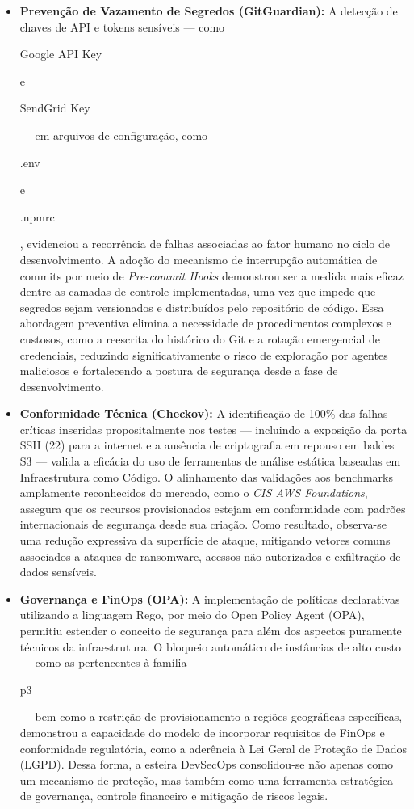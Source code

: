 \begin{itemize}
    \item\textbf{Prevenção de Vazamento de Segredos (GitGuardian):} 
    A detecção de chaves de API e tokens sensíveis — como \begin{foo}Google API Key\end{foo}
    e \begin{foo}SendGrid Key\end{foo}
    — em arquivos de configuração, como \begin{foo}.env\end{foo}
    e \begin{foo}.npmrc\end{foo}
    , evidenciou a recorrência de falhas associadas ao fator humano no ciclo de desenvolvimento. A adoção do mecanismo de interrupção automática de commits por meio de \textit{Pre-commit Hooks} demonstrou ser a medida mais eficaz dentre as camadas de controle implementadas, uma vez que impede que segredos sejam versionados e distribuídos pelo repositório de código. Essa abordagem preventiva elimina a necessidade de procedimentos complexos e custosos, como a reescrita do histórico do Git e a rotação emergencial de credenciais, reduzindo significativamente o risco de exploração por agentes maliciosos e fortalecendo a postura de segurança desde a fase de desenvolvimento.

    \item\textbf{Conformidade Técnica (Checkov):} 
    A identificação de 100\% das falhas críticas inseridas propositalmente nos testes — incluindo a exposição da porta SSH (22) para a internet e a ausência de criptografia em repouso em baldes S3 — valida a eficácia do uso de ferramentas de análise estática baseadas em Infraestrutura como Código. O alinhamento das validações aos benchmarks amplamente reconhecidos do mercado, como o \textit{CIS AWS Foundations}, assegura que os recursos provisionados estejam em conformidade com padrões internacionais de segurança desde sua criação. Como resultado, observa-se uma redução expressiva da superfície de ataque, mitigando vetores comuns associados a ataques de ransomware, acessos não autorizados e exfiltração de dados sensíveis.

    \item\textbf{Governança e FinOps (OPA):} 
    A implementação de políticas declarativas utilizando a linguagem Rego, por meio do Open Policy Agent (OPA), permitiu estender o conceito de segurança para além dos aspectos puramente técnicos da infraestrutura. O bloqueio automático de instâncias de alto custo — como as pertencentes à família \begin{foo}p3\end{foo}
    — bem como a restrição de provisionamento a regiões geográficas específicas, demonstrou a capacidade do modelo de incorporar requisitos de FinOps e conformidade regulatória, como a aderência à Lei Geral de Proteção de Dados (LGPD). Dessa forma, a esteira DevSecOps consolidou-se não apenas como um mecanismo de proteção, mas também como uma ferramenta estratégica de governança, controle financeiro e mitigação de riscos legais.
\end{itemize}

